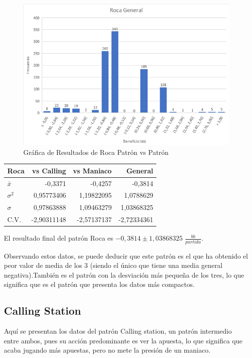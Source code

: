 \begin{figure}[h]
\centering
\includegraphics[width=1\textwidth]{figuras/RG.png}   
\caption{Gráfica de Resultados de Roca  Patrón vs Patrón}
\label{fig:RGR}
\end{figure}


\begin{longtable}[c]{lrrr}
\hline
Roca & vs Calling & vs Maniaco & General \\ \hline
$\bar{x}$ & -0,3371 & -0,4257 & -0,3814 \\
$\sigma^2$ & 0,95773406 & 1,19822095 & 1,0788629 \\ 
$\sigma$ & 0,97863888 & 1,09463279 & 1,03868325 \\ 
C.V. & -2,90311148 & -2,57137137 & -2,72334361 \\ \hline
\end{longtable}

El resultado final del patrón Roca es $-0,3814\pm1,03868325$ $\frac{bb}{partida}$.

\smallskip

Observando estos datos, se puede deducir que este patrón es el que ha obtenido el peor valor de media de los 3 (siendo el único que tiene una media general negativa).También es el patrón con la desviación más pequeña de los tres, lo que significa que es el patrón que presenta los datos más compactos.

\clearpage

\subsection{Calling Station}

Aquí se presentan los datos del patrón Calling station, un patrón intermedio entre ambos, pues su acción predominante es ver la apuesta, lo que significa que acaba jugando más apuestas, pero no mete la presión de un maniaco.

